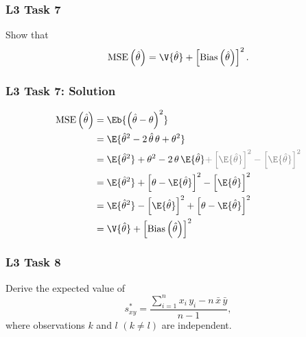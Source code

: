 \documentclass[compress]{beamer}\usepackage[]{graphicx}\usepackage[]{xcolor}
\begin{document}
\begin{frame}[fragile]
  \frametitle{L3 Task 7}
    Show that
    \[ \text{MSE} \left( \hat{\theta} \right) = \V{\hat{\theta}} + \left[ \text{Bias} \left( \hat{\theta} \right) \right]^2. \]
\end{frame}


\begin{frame}[fragile]
  \frametitle{L3 Task 7: Solution}
    \begin{equation*}
      \begin{aligned}
        \text{MSE} \left( \hat{\theta} \right) &= \Eb{ \left( \hat{\theta} - \theta \right)^2 } \\
          &= \E{ \hat{\theta}^2 - 2\,\hat{\theta}\,\theta + \theta^2 } \\
          &= \E{ \hat{\theta}^2 } + \theta^2 - 2\,\theta\,\E{ \hat{\theta} } \color{gray}{+ \left[ \E{ \hat{\theta} } \right]^2 - \left[ \E{ \hat{\theta} } \right]^2}\\
          &= \E{ \hat{\theta}^2 } + \left[ \theta - \E{ \hat{\theta} } \right]^2 - \left[ \E{ \hat{\theta} } \right]^2 \\
          &= \E{ \hat{\theta}^2 } - \left[ \E{ \hat{\theta} } \right]^2 + \left[ \theta - \E{ \hat{\theta} } \right]^2\\
          &= \V{ \hat{\theta} } + \left[ \text{Bias} \left( \hat{\theta} \right) \right]^2
      \end{aligned}
    \end{equation*}
\end{frame}


\begin{frame}[fragile]
  \frametitle{L3 Task 8}
    Derive the expected value of
    \[ s_{xy}^* = \frac{\sum_{i=1}^n x_i\, y_i - n\,\bar{x}\,\bar{y}}{n-1},
    \]
    where observations $k$ and $l$ $(k \neq l)$ are independent.
\end{frame}
\end{document}

